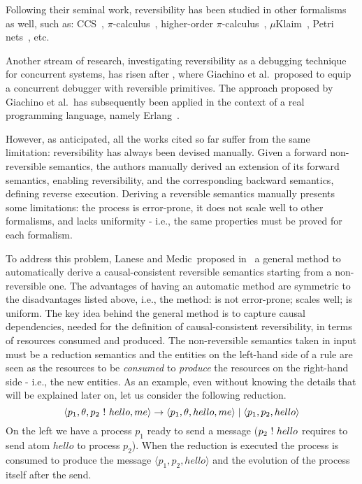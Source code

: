 \documentclass{article}[12pt,a4paper]
\theoremstyle{definition}
\newcommand{\paral}{\;|\;}
\begin{document}
Following their seminal work, reversibility has been studied in other formalisms
as well, such as: CCS~\cite{DanosK04,PhillipsU07}, $\pi$-calculus~\cite{CristescuKV13}, higher-order $\pi$-calculus~\cite{LaneseMS16},
$\mu$Klaim~\cite{GiachinoLMT17}, Petri nets~\cite{PhilippouP18,MelgrattiMU20}, etc.

Another stream of research, investigating reversibility as a debugging technique for concurrent systems,
has risen after \cite{GiachinoLM14}, where Giachino et al.~proposed to
equip a concurrent debugger with reversible primitives.
The approach proposed by Giachino et al.~has subsequently been applied in the context of a real programming language, namely Erlang~\cite{LaneseNPV18,Lanese0PV18,Gonzalez-AbrilV21,FabbrettiLS21}.

However, as anticipated, all the works cited so far suffer from the same limitation: reversibility has always been
devised manually. Given a forward non-reversible semantics, the authors manually
derived an extension of its forward semantics, enabling reversibility, and the corresponding backward semantics, defining reverse execution.
Deriving a reversible semantics manually presents some limitations: the
process is error-prone, it does not scale well to other formalisms, and lacks
uniformity - i.e., the same properties must be proved for each formalism.

To address this problem, Lanese and Medic~proposed in~\cite{LaneseM20} a
general method to
automatically derive a causal-consistent reversible semantics starting from a non-reversible one. The
advantages of having an automatic method are symmetric to the disadvantages
listed above, i.e., the method: is not error-prone; scales well; is uniform. The key idea behind the general method is to capture
causal dependencies, needed for the definition of causal-consistent reversibility, in terms of resources consumed and produced. The non-reversible
semantics taken in input must be a reduction semantics and the entities on the
left-hand side of a rule are seen as the resources to be \emph{consumed} to
\emph{produce} the resources on the right-hand side - i.e., the new entities.
As an example, even without knowing the details that will be explained later on, let
us consider the following reduction. 
\begin{equation}\label{samplerule}
\langle p_1, \theta, p_2~\ms{!}~hello, me\rangle \rightarrow \langle p_1, \theta,
hello, me\rangle \paral\langle p_1, p_2,hello \rangle
\end{equation}
On the left we have a process $p_1$ ready to send a
message ($p_2~\mathsf{!}~hello$ requires to send atom $hello$ to process $p_2$). When the reduction is executed the process is consumed to produce the message
$\langle p_1, p_2,hello \rangle$ and the evolution of the process itself after the send.
\end{document}
